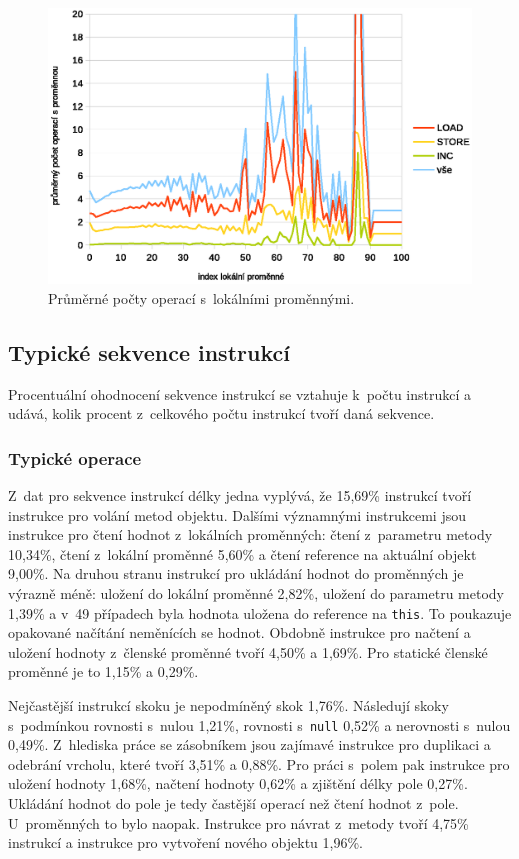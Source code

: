 \begin{figure}[h!]
\centering
\includegraphics[scale=0.9]{fig/locals} 
\caption{Průměrné počty operací s~lokálními proměnnými.}\label{fig:vars}
\end{figure}

\subsection{Typické sekvence instrukcí}

Procentuální ohodnocení sekvence instrukcí se vztahuje k~počtu instrukcí a udává, kolik procent z~celkového počtu instrukcí tvoří daná sekvence. 

\subsubsection{Typické operace}

Z~dat pro sekvence instrukcí délky jedna vyplývá, že 15,69\% instrukcí tvoří instrukce pro volání metod objektu. 
Dalšími významnými instrukcemi jsou instrukce pro čtení hodnot z~lokálních proměnných: čtení z~parametru metody 10,34\%, čtení z~lokální proměnné 5,60\% a čtení reference na aktuální objekt 9,00\%. Na druhou stranu instrukcí pro ukládání hodnot do proměnných je výrazně méně: uložení do lokální proměnné 2,82\%, uložení do parametru metody 1,39\% a v~49 případech byla hodnota uložena do reference na \texttt{this}. To poukazuje opakované načítání neměnících se hodnot. Obdobně instrukce pro načtení a uložení hodnoty z~členské proměnné tvoří 4,50\% a 1,69\%. Pro statické členské proměnné je to 1,15\% a 0,29\%. 

Nejčastější instrukcí skoku je nepodmíněný skok 1,76\%. Následují skoky s~podmínkou rovnosti s~nulou 1,21\%, rovnosti s~\texttt{null} 0,52\% a nerovnosti s~nulou 0,49\%. Z~hlediska práce se zásobníkem jsou zajímavé instrukce pro duplikaci a odebrání vrcholu, které tvoří 3,51\% a 0,88\%. Pro práci s~polem pak instrukce pro uložení hodnoty 1,68\%, načtení hodnoty 0,62\% a zjištění délky pole 0,27\%. Ukládání hodnot do pole je tedy častější operací než čtení hodnot z~pole. U~proměnných to bylo naopak. Instrukce pro návrat z~metody tvoří 4,75\% instrukcí a instrukce pro vytvoření nového objektu 1,96\%.

